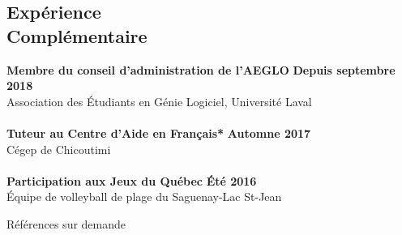 \documentclass[margin,line]{resume}
\begin{document}
\begin{resume}
    \section{\mysidestyle Exp\'{e}rience\\Compl\'{e}mentaire}
     \textbf{Membre du conseil d'administration de l'AEGLO} \hfill \textbf{Depuis septembre 2018} \vspace{2mm}\\\vspace{1mm}%
    Association des \'{E}tudiants en G\'{e}nie Logiciel, Universit\'{e} Laval \\ \\
   \textbf{Tuteur au Centre d'Aide en Fran\c{c}ais*} \hfill \textbf{Automne 2017} \vspace{2mm}\\\vspace{1mm}%
    C\'{e}gep de Chicoutimi \\ \\
    \textbf{Participation aux Jeux du Qu\'{e}bec} \hfill \textbf{\'{E}t\'{e} 2016} \vspace{2mm}\\\vspace{1mm}%
    \'{E}quipe de volleyball de plage du Saguenay-Lac St-Jean \\ 
    
    

\end{resume}


\name{}
\begin{resume}
\hfill *R\'{e}f\'{e}rences sur demande
\end{resume}
\end{document}
